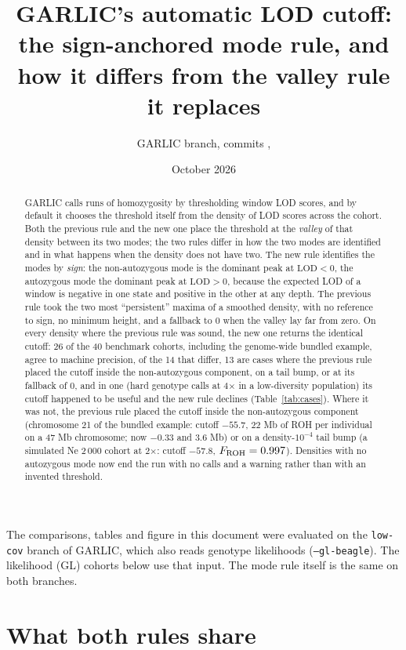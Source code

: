 \documentclass[11pt]{article}
\title{GARLIC's automatic LOD cutoff:\\ the sign-anchored mode rule, and how it differs from the valley rule it replaces}
\author{GARLIC \code{low-cov} branch, commits \code{525bf13}, \code{f7bc79f}}
\date{October 2026}
\newcommand{\lod}{\mathrm{LOD}}
\newcommand{\code}[1]{\texttt{#1}}
\begin{document}
\maketitle

\begin{abstract}
GARLIC calls runs of homozygosity by thresholding window LOD scores, and by default it chooses the threshold itself from the density of LOD scores across the cohort. Both the previous rule and the new one place the threshold at the \emph{valley} of that density between its two modes; the two rules differ in how the two modes are identified and in what happens when the density does not have two. The new rule identifies the modes by \emph{sign}: the non-autozygous mode is the dominant peak at $\lod<0$, the autozygous mode the dominant peak at $\lod>0$, because the expected LOD of a window is negative in one state and positive in the other at any depth. The previous rule took the two most ``persistent'' maxima of a smoothed density, with no reference to sign, no minimum height, and a fallback to 0 when the valley lay far from zero. On every density where the previous rule was sound, the new one returns the identical cutoff: 26 of the 40 benchmark cohorts, including the genome-wide bundled example, agree to machine precision, of the 14 that differ, 13 are cases where the previous rule placed the cutoff inside the non-autozygous component, on a tail bump, or at its fallback of 0, and in one (hard genotype calls at 4$\times$ in a low-diversity population) its cutoff happened to be useful and the new rule declines (Table~\ref{tab:cases}). Where it was not, the previous rule placed the cutoff inside the non-autozygous component (chromosome 21 of the bundled example: cutoff $-55.7$, 22 Mb of ROH per individual on a 47 Mb chromosome; now $-0.33$ and 3.6 Mb) or on a density-$10^{-4}$ tail bump (a simulated Ne 2\,000 cohort at 2$\times$: cutoff $-57.8$, $F_{\rm ROH}=0.997$). Densities with no autozygous mode now end the run with no calls and a warning rather than with an invented threshold.
\end{abstract}

\noindent The comparisons, tables and figure in this document were evaluated on the \code{low-cov} branch of GARLIC, which also reads genotype likelihoods (\code{--gl-beagle}).  The likelihood (GL) cohorts below use that input.  The mode rule itself is the same on both branches.

\section{What both rules share}
\end{document}
